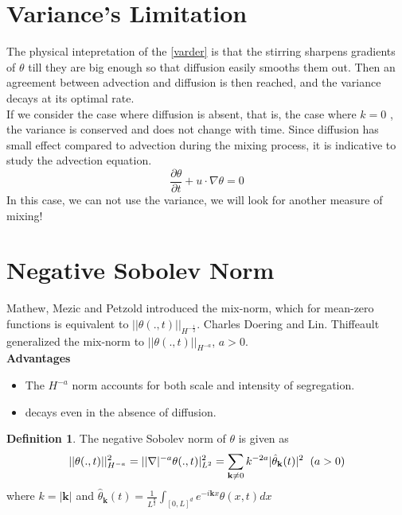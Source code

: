 \documentclass[12pt]{report}   %
\numberwithin{equation}{section}
\theoremstyle{plain}
\theoremstyle{definition}
\newtheorem{definition}[lemma]{Definition}
\theoremstyle{remark}
\DeclarePairedDelimiter{\norm}{|}{|}
\begin{document}
  \section{Variance's Limitation}
  The physical intepretation of the \eqref{varder} is that the stirring
        sharpens gradients of $\theta$ till they are big enough so that diffusion easily smooths them out. Then an agreement  between advection and diffusion is then reached, and the variance decays at its optimal rate.\\
        \vspace{0.01cm}
 If we consider the case where diffusion is absent, that is, the case where $k =0$ ,  the variance is conserved and does not change with time. Since diffusion has small effect compared to advection during the mixing process, it is indicative to study the advection equation.
   \begin{equation}
    \frac{\partial\theta}{\partial t} + u\cdot\nabla\theta = 0
    \end{equation}
    In this case, we can not use the variance, we will look for another measure of mixing!
  
  \section{Negative Sobolev Norm}
  Mathew, Mezic and Petzold \cite{mathew} introduced the mix-norm, which for mean-zero functions is equivalent to $||\theta(.,t)||_{H^{-\frac{1}{2}}}$.
  Charles Doering and Lin. Thiffeault\cite{multi} generalized the mix-norm to $||\theta(.,t)||_{H^{-a}}$, $a >0.$ \\
  \vspace{0.2cm}
  \textbf{Advantages}
  \begin{itemize}
  \item The $H^{-a}$ norm accounts for both scale and intensity of segregation.
  \item  decays even in the absence of diffusion.
  \end{itemize} 
  \begin{definition}
 The negative Sobolev norm of $\theta$ is given as
  \[||\theta(.,t)||_{H^{-a}}^2 = \norm{|\nabla|^{-a}\theta(.,t)}_{L^2}^2 = \sum_{\textbf{k}\neq0}k^{-2a}|\hat{\theta}_{\textbf{k}}(t)|^2 \hspace{0.2cm} (a>0)\]
  where $k = |\textbf{k}|$ and $\hat{\theta}_{\textbf{k}} (t) = \frac{1}{L^{\frac{d}{2}}}\int_{[0,L]^d}e^{-i{\textbf{k}}x}\theta(x,t)dx$
  \end{definition}
\end{document}
